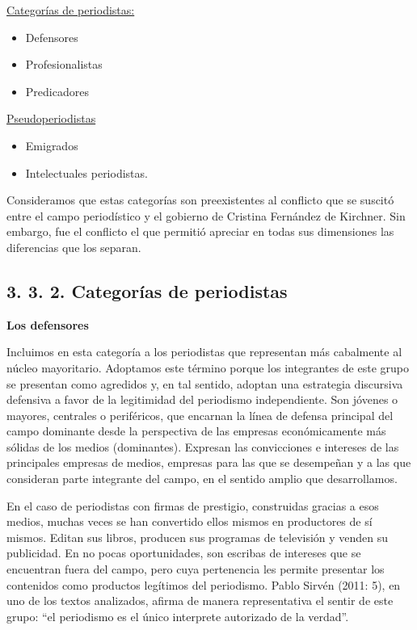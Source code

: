 {\ul{Categorías de periodistas:}

\begin{itemize}
\item
  Defensores
\item
  Profesionalistas
\item
  Predicadores
\end{itemize}

\ul{Pseudoperiodistas}

\begin{itemize}
\item
  Emigrados
\item
  Intelectuales periodistas.
\end{itemize}

Consideramos que estas categorías son preexistentes al conflicto que se suscitó entre el campo periodístico y el gobierno de Cristina Fernández de Kirchner. Sin embargo, fue el conflicto el que permitió apreciar en todas sus dimensiones las diferencias que los separan.

\subsection{3. 3. 2. Categorías de periodistas}

\textbf{Los defensores}

Incluimos en esta categoría a los periodistas que representan más cabalmente al núcleo mayoritario. Adoptamos este término porque los integrantes de este grupo se presentan como agredidos y, en tal sentido, adoptan una estrategia discursiva defensiva a favor de la legitimidad del periodismo independiente. Son jóvenes o mayores, centrales o periféricos, que encarnan la línea de defensa principal del campo dominante desde la perspectiva de las empresas económicamente más sólidas de los medios (dominantes). Expresan las convicciones e intereses de las principales empresas de medios, empresas para las que se desempeñan y a las que consideran parte integrante del campo, en el sentido amplio que desarrollamos.

En el caso de periodistas con firmas de prestigio, construidas gracias a esos medios, muchas veces se han convertido ellos mismos en productores de sí mismos. Editan sus libros, producen sus programas de televisión y venden su publicidad. En no pocas oportunidades, son escribas de intereses que se encuentran fuera del campo, pero cuya pertenencia les permite presentar los contenidos como productos legítimos del periodismo. Pablo Sirvén (2011: 5), en uno de los textos analizados, afirma de manera representativa el sentir de este grupo: ``el periodismo es el único interprete autorizado de la verdad''.

}
